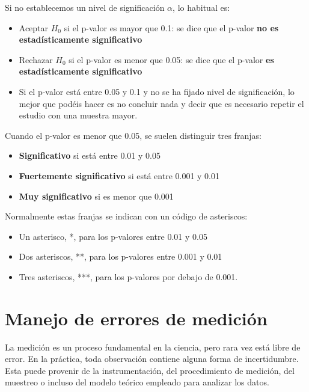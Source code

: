 \documentclass[
  spanish,
  letterpaper,
  DIV=11,
  numbers=noendperiod]{scrreprt}
\providecommand{\tightlist}{%
  \setlength{\itemsep}{0pt}\setlength{\parskip}{0pt}}
\begin{document}
Si no establecemos un nivel de significación \(\alpha\), lo habitual es:

\begin{itemize}
\item
  Aceptar \(H_0\) si el p-valor es mayor que 0.1: se dice que el p-valor
  \textbf{no es estadísticamente significativo}
\item
  Rechazar \(H_0\) si el p-valor es menor que 0.05: se dice que el
  p-valor \textbf{es estadísticamente significativo}
\item
  Si el p-valor está entre 0.05 y 0.1 y no se ha fijado nivel de
  significación, lo mejor que podéis hacer es no concluir nada y decir
  que es necesario repetir el estudio con una muestra mayor.
\end{itemize}

Cuando el p-valor es menor que 0.05, se suelen distinguir tres franjas:

\begin{itemize}
\tightlist
\item
  \textbf{Significativo} si está entre 0.01 y 0.05
\item
  \textbf{Fuertemente significativo} si está entre 0.001 y 0.01
\item
  \textbf{Muy significativo} si es menor que 0.001
\end{itemize}

Normalmente estas franjas se indican con un código de asteriscos:

\begin{itemize}
\item
  Un asterisco, *, para los p-valores entre 0.01 y 0.05
\item
  Dos asteriscos, **, para los p-valores entre 0.001 y 0.01
\item
  Tres asteriscos, ***, para los p-valores por debajo de 0.001.
\end{itemize}


\chapter{Manejo de errores de
medición}\label{manejo-de-errores-de-mediciuxf3n}

La medición es un proceso fundamental en la ciencia, pero rara vez está
libre de error. En la práctica, toda observación contiene alguna forma
de incertidumbre. Esta puede provenir de la instrumentación, del
procedimiento de medición, del muestreo o incluso del modelo teórico
empleado para analizar los datos.
\end{document}
